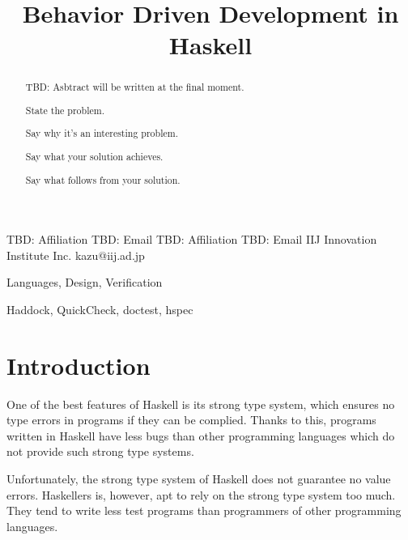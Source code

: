 \documentclass[preprint]{sigplanconf}
\begin{document}
\copyrightdata{[to be supplied]}


\title{Behavior Driven Development in Haskell}

           {TBD: Affiliation}
           {TBD: Email}
           {TBD: Affiliation}
           {TBD: Email}
           {IIJ Innovation Institute Inc.}
           {kazu@iij.ad.jp}

\maketitle

\begin{abstract}

TBD: Asbtract will be written at the final moment.

State the problem.

Say why it’s an interesting problem.

Say what your solution achieves.

Say what follows from your solution.

\end{abstract}


\terms Languages, Design, Verification

\keywords Haddock, QuickCheck, doctest, hspec

\section{Introduction}


One of the best features of Haskell is its strong type system, 
which ensures no type errors in programs if they can be complied.
Thanks to this, programs written in Haskell have less bugs
than other programming languages which do not provide such strong type systems.

Unfortunately, the strong type system of Haskell does not guarantee
no value errors.
Haskellers is, however, apt to rely on the strong type system too much.
They tend to write less test programs than programmers of other
programming languages.
\end{document}

